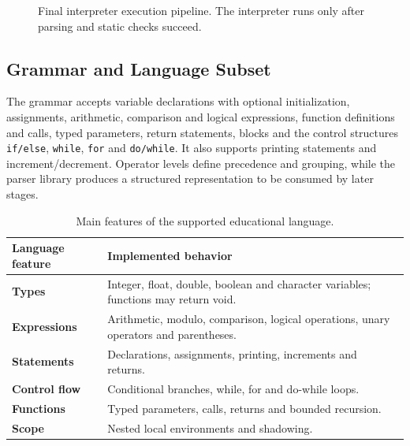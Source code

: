 \documentclass[letterpaper,12pt,oneside]{article}
\begin{document}
\begin{figure}[H]\centering
{}
\caption{Final interpreter execution pipeline. The interpreter runs only after parsing and static checks succeed.}\label{fig:architecture}
\end{figure}

\subsection{Grammar and Language Subset}
The grammar accepts variable declarations with optional initialization, assignments, arithmetic, comparison and logical expressions, function definitions and calls, typed parameters, return statements, blocks and the control structures \texttt{if/else}, \texttt{while}, \texttt{for} and \texttt{do/while}. It also supports printing statements and increment/decrement. Operator levels define precedence and grouping, while the parser library produces a structured representation to be consumed by later stages.

\begin{table}[H]\centering\small
\caption{Main features of the supported educational language.}
\begin{tabularx}{\textwidth}{>{\bfseries}p{} X}\toprule
Language feature & Implemented behavior\\\midrule
Types & Integer, float, double, boolean and character variables; functions may return void.\\
Expressions & Arithmetic, modulo, comparison, logical operations, unary operators and parentheses.\\
Statements & Declarations, assignments, printing, increments and returns.\\
Control flow & Conditional branches, while, for and do-while loops.\\
Functions & Typed parameters, calls, returns and bounded recursion.\\
Scope & Nested local environments and shadowing.\\
\bottomrule\end{tabularx}\end{table}
\end{document}
